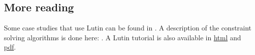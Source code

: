 \subsection{More reading}

Some case studies that use Lutin can be found in \cite{tacas,sies}.
A description of the constraint solving algorithms is done here:
\cite{jahier-cstva06}.
A Lutin tutorial is also available in \href{http://www-verimag.imag.fr/DIST-TOOLS/SYNCHRONE/lurette/doc/lutin-tuto/lutin-tuto-html.html}{html} and \href{http://www-verimag.imag.fr/DIST-TOOLS/SYNCHRONE/lurette/doc/lutin-tuto/lutin-tuto-pdf.pdf}{pdf}.  

